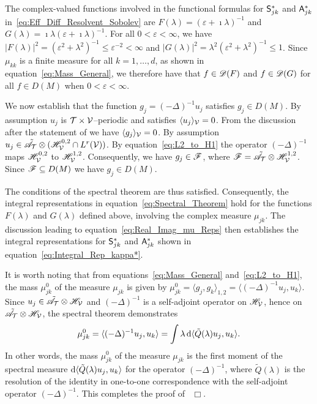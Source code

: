 \documentclass[amsa]{ipart}
\begin{document}
The
complex-valued functions involved in the functional formulas for
$\mathsf{S}^*_{jk}$ and $\mathsf{A}^*_{jk}$ in~\eqref{eq:Eff_Diff_Resolvent_Sobolev}
are $F(\lambda)=(\varepsilon+\imath\lambda)^{-1}$ and $G(\lambda)=\imath\lambda(\varepsilon+\imath\lambda)^{-1}$. For all $0<\varepsilon<\infty$, 
we have $|F(\lambda)|^2=(\varepsilon^2+\lambda^2)^{-1}\leq\varepsilon^{-2}<\infty$ and 
$|G(\lambda)|^2=\lambda^2(\varepsilon^2+\lambda^2)^{-1}\leq 1$. Since $\mu_{kk}$ is a finite measure
for all $k=1,\ldots,d$, as shown in equation~\eqref{eq:Mass_General}, we
therefore have 
that $f\in\mathscr{D}(F)$ and $f\in\mathscr{D}(G)$ for all $f\in D(M)$ when $0<\varepsilon<\infty$.



We now establish that the function $g_j=(-\Delta)^{-1}u_j$ satisfies $g_j\in
D(M)$.  By assumption $u_j$ is $\mathcal{T}\times\mathcal{V}$--periodic and satisfies $\langle
u_j\rangle_{\mathcal{V}}=0$. From the discussion after the statement of 
 we have $\langle g_j\rangle_{\mathcal{V}}=0$. By assumption
$u_j\in\tilde{\mathscr{A}}_{\mathcal{T}}\otimes (\mathscr{H}^{0,2}_{\mathcal{V}}\cap L^r(\mathcal{V}))$. By
equation~\eqref{eq:L2_to_H1} the 
operator $(-\Delta)^{-1}$ maps $\mathscr{H}^{0,2}_{\mathcal{V}}$ to
$\mathscr{H}^{1,2}_{\mathcal{V}}$. Consequently, we have 
$g_j\in\mathscr{F}$, where $\mathscr{F}=\tilde{\mathscr{A}}_{\mathcal{T}}\otimes\mathscr{H}^{1,2}_{\mathcal{V}}$. Since $\mathscr{F}\subseteq
D(M)$ we have $g_j\in D(M)$.  


The conditions of the
spectral theorem are thus satisfied. Consequently, the integral
representations in equation~\eqref{eq:Spectral_Theorem} hold for the
functions $F(\lambda)$ and $G(\lambda)$ defined above, involving the complex
measure $\mu_{jk}$. The discussion leading to
equation~\eqref{eq:Real_Imag_mu_Reps} then establishes the integral
representations for $\mathsf{S}^*_{jk}$ and $\mathsf{A}^*_{jk}$ shown in
equation~\eqref{eq:Integral_Rep_kappa*}. 




It is worth noting that from
equations~\eqref{eq:Mass_General} and~\eqref{eq:L2_to_H1}, the mass 
$\mu_{jk}^0$ of the measure $\mu_{jk}$ is given by
$\mu_{jk}^0=\langle g_j,g_k\rangle_{1,2}=\langle(-\Delta)^{-1}u_j,u_k\rangle$. Since
$u_j\in\tilde{\mathscr{A}}_{\mathcal{T}}\otimes\mathscr{H}_{\mathcal{V}}$ and $(-\Delta)^{-1}$ is a
self-adjoint operator on $\mathscr{H}_{\mathcal{V}}$, hence on
$\tilde{\mathscr{A}}_{\mathcal{T}}\otimes\mathscr{H}_{\mathcal{V}}$, the spectral theorem demonstrates
%
\begin{align}\label{eq:Laplacian_moment}
  \mu_{jk}^0=\langle(-\Delta)^{-1}u_j,u_k\rangle=\int\lambda\,\d\langle\tilde{Q}(\lambda)u_j,u_k\rangle.
\end{align}
%
In other words, the mass $\mu_{jk}^0$ of the measure $\mu_{jk}$ is the
first moment of the spectral measure $\mathrm{d}\langle\tilde{Q}(\lambda)u_j,u_k\rangle$ for 
the operator $(-\Delta)^{-1}$, where $\tilde{Q}(\lambda)$ is
the resolution of the identity in one-to-one correspondence with the 
self-adjoint operator $(-\Delta)^{-1}$. This completes the proof
of~ $\Box$.  
\end{document}
